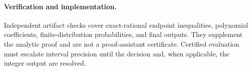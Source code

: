 \paragraph{Verification and implementation.}
Independent artifact checks cover exact-rational endpoint inequalities,
polynomial coefficients, finite-distribution probabilities, and final
outputs. They supplement the analytic proof and are not a proof-assistant
certificate. Certified evaluation must escalate interval precision until
the decision and, when applicable, the integer output are resolved.

